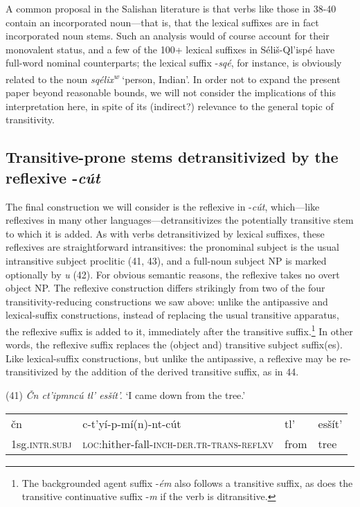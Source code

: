 \documentclass[output=paper,colorlinks,citecolor=brown]{langscibook}
\begin{document}
A common proposal in the Salishan literature is that verbs like those
in 38-40 contain an incorporated noun---that is, that the lexical
suffixes are in fact incorporated noun stems.  Such an analysis would
of course account for their monovalent status, and a few of the 100+
lexical suffixes in S\'eli\v{s}-Ql'isp\'e have full-word nominal
counterparts; the lexical suffix -\emph{sq\'e}, for instance, is
obviously related to the noun \emph{sq\'elix\textsuperscript w}
`person, Indian'.  In order not to expand the present paper beyond
reasonable bounds, we will not consider the implications of this
interpretation here, in spite of its (indirect?) relevance to the
general topic of transitivity.

\subsection{Transitive-prone stems detransitivized by the reflexive
 -\emph{c\'ut}}   %


The final construction we will consider is the reflexive in
-\emph{c\'ut}, which---like reflexives in many other
languages---detransitivizes the potentially transitive stem to which
it is added.  As with verbs detransitivized by lexical suffixes, these
reflexives are straightforward intransitives: the pronominal subject
is the usual intransitive subject proclitic (41, 43), and a full-noun
subject NP is marked optionally by \emph{{\textltilde}u} (42).  For
obvious semantic reasons, the reflexive takes no overt object NP.  The
reflexive construction differs strikingly from two of the four
transitivity-reducing constructions we saw above: unlike the
antipassive and lexical-suffix constructions, instead of replacing the
usual transitive apparatus, the reflexive suffix is added to it,
immediately after the transitive suffix.\footnote{The backgrounded
agent suffix -\emph{\'em} also follows a transitive suffix, as does
the transitive continuative suffix -\emph{m} if the verb is
ditransitive.}  In other words, the reflexive suffix replaces the
(object and) transitive subject suffix(es).  Like lexical-suffix
constructions, but unlike the antipassive, a reflexive may be
re-transitivized by the addition of the derived transitive suffix, as
in 44.

\bigskip

(41) \emph{\v{C}n ct'ipmnc\'u tl' es\v{s}\'it'.}  `I came down from the tree.'

\medskip

\noindent\hspace*{.3in}\parbox[t]{5.5in}{

\begin{tabular} {llll}

\v{c}n& c-t'y\'i-p-m\'i(n)-nt-c\'ut& tl'& es\v{s}\'it'\\

1sg.\textsc{intr.subj}& \textsc{loc}:hither-fall-\textsc{inch-der.tr-trans-reflxv}&
from& tree\\

\end{tabular}

}
\end{document}
